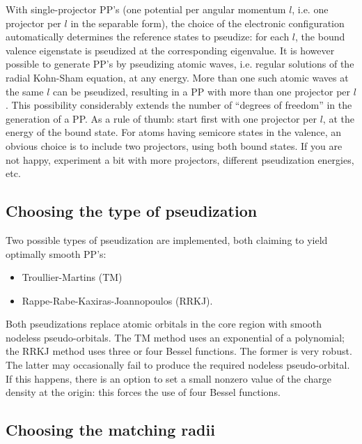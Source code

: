 With single-projector PP's (one potential per angular momentum $l$, 
i.e. one projector per $l$ in the separable form), the choice of the 
electronic configuration automatically determines the reference states
to pseudize: for each $l$, the bound valence eigenstate is pseudized
at the corresponding eigenvalue.
It is however possible to generate PP's by pseudizing atomic waves,
i.e. regular solutions of the radial Kohn-Sham equation, at any
energy. More than one such atomic waves at the same $l$ can be 
pseudized, resulting in a PP with more than one projector per $l$. 
This possibility considerably extends the number of ``degrees of 
freedom'' in the generation of a PP. As a rule of thumb: start first 
with one projector per $l$, at the energy of the bound state. For
atoms having semicore states in the valence, an obvious choice is 
to include two projectors, using both bound states. If you are not 
happy, experiment a bit with more projectors, different pseudization 
energies, etc.

\subsection{Choosing the type of pseudization}

Two possible types of pseudization are implemented, both claiming
to yield optimally smooth PP's:
\begin{itemize}
\item Troullier-Martins \cite{TM} (TM) 
\item Rappe-Rabe-Kaxiras-Joannopoulos \cite{RRKJ} (RRKJ).
\end{itemize}
Both pseudizations replace atomic orbitals in the core region 
with smooth nodeless pseudo-orbitals. The TM method uses an
exponential of a polynomial; the RRKJ method uses three or four
Bessel functions. The former is very robust. The latter may 
occasionally fail to produce the required nodeless pseudo-orbital.
If this happens, there is an option to set a small nonzero value of 
the charge density at the origin: this forces the use of four Bessel 
functions.

\subsection{Choosing the matching radii}

